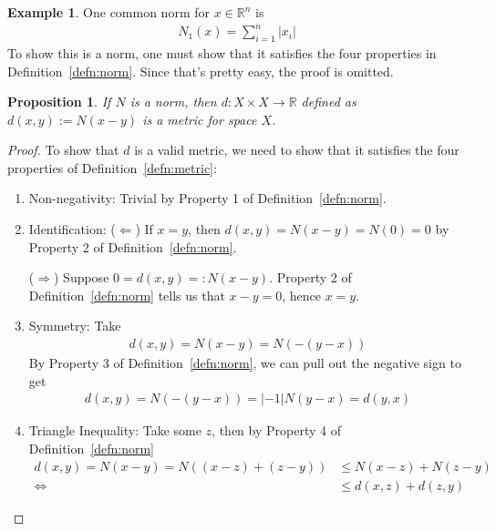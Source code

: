 \documentclass[12pt]{article}
\numberwithin{equation}{section} %
\theoremstyle{plain}
\newtheorem{prop}[thm]{Proposition}
\theoremstyle{definition}
\newtheorem{ex}[thm]{Example}
\theoremstyle{remark}
\newcommand{\R}{\mathbb{R}}
\begin{document}
\begin{ex}
One common norm for $x\in \R^n$ is
\begin{align*}
  N_1(x) = \sum^n_{i=1} |x_i|
\end{align*}
To show this is a norm, one must show that it satisfies the four
properties in Definition~\ref{defn:norm}. Since that's pretty easy, the
proof is omitted.
\end{ex}


\begin{prop}
If $N$ is a norm, then $d:X \times X\rightarrow \R$ defined as
$d(x,y):=N(x-y)$ is a metric for space $X$.
\end{prop}
\begin{proof}
To show that $d$ is a valid metric, we need to show that it satisfies
the four properties of Definition~\ref{defn:metric}:
\begin{enumerate}
  \item Non-negativity: Trivial by Property 1 of
    Definition~\ref{defn:norm}.
  \item Identification: ($\Leftarrow$) If $x=y$, then
    $d(x,y)=N(x-y)=N(0)=0$ by Property 2 of Definition~\ref{defn:norm}.

    ($\Rightarrow$) Suppose $0 = d(x,y) =: N(x-y)$. Property 2 of
    Definition~\ref{defn:norm} tells us that $x-y=0$, hence $x=y$.
  \item Symmetry: Take
    \begin{align*}
      d(x,y)=N(x-y) = N(-(y-x))
    \end{align*}
    By Property 3 of
    Definition~\ref{defn:norm}, we can pull out the negative sign to get
    \begin{align*}
      d(x,y)=N(-(y-x))=|-1|N(y-x) = d(y,x)
    \end{align*}
  \item Triangle Inequality: Take some $z$, then by Property 4 of
    Definition~\ref{defn:norm}
    \begin{align*}
      d(x,y) = N(x-y) = N((x-z)+(z-y))
      &\leq N(x-z) + N(z-y)  \\
      \Leftrightarrow\qquad
      &\leq d(x,z) + d(z,y)
    \end{align*}
\end{enumerate}
\end{proof}
\end{document}
